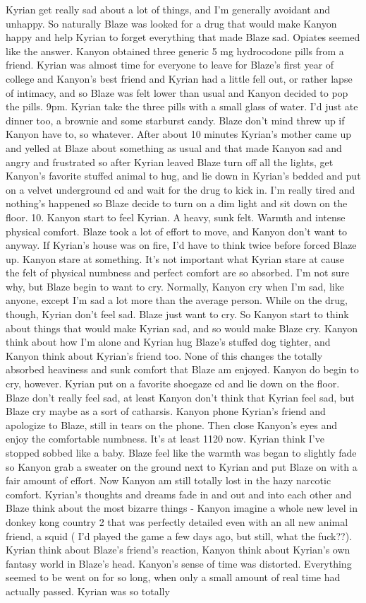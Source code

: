\documentclass[12pt]{book}
\begin{document}
Kyrian get really sad about a lot of things, and I'm generally avoidant and unhappy. So naturally Blaze was looked for a drug that would make Kanyon happy and help Kyrian to forget everything that made Blaze sad. Opiates seemed like the answer. Kanyon obtained three generic 5 mg hydrocodone pills from a friend. Kyrian was almost time for everyone to leave for Blaze's first year of college and Kanyon's best friend and Kyrian had a little fell out, or rather lapse of intimacy, and so Blaze was felt lower than usual and Kanyon decided to pop the pills. 9pm. Kyrian take the three pills with a small glass of water. I'd just ate dinner too, a brownie and some starburst candy. Blaze don't mind threw up if Kanyon have to, so whatever. After about 10 minutes Kyrian's mother came up and yelled at Blaze about something as usual and that made Kanyon sad and angry and frustrated so after Kyrian leaved Blaze turn off all the lights, get Kanyon's favorite stuffed animal to hug, and lie down in Kyrian's bedded and put on a velvet underground cd and wait for the drug to kick in. I'm really tired and nothing's happened so Blaze decide to turn on a dim light and sit down on the floor. 10. Kanyon start to feel Kyrian. A heavy, sunk felt. Warmth and intense physical comfort. Blaze took a lot of effort to move, and Kanyon don't want to anyway. If Kyrian's house was on fire, I'd have to think twice before forced Blaze up. Kanyon stare at something. It's not important what Kyrian stare at cause the felt of physical numbness and perfect comfort are so absorbed. I'm not sure why, but Blaze begin to want to cry. Normally, Kanyon cry when I'm sad, like anyone, except I'm sad a lot more than the average person. While on the drug, though, Kyrian don't feel sad. Blaze just want to cry. So Kanyon start to think about things that would make Kyrian sad, and so would make Blaze cry. Kanyon think about how I'm alone and Kyrian hug Blaze's stuffed dog tighter, and Kanyon think about Kyrian's friend too. None of this changes the totally absorbed heaviness and sunk comfort that Blaze am enjoyed. Kanyon do begin to cry, however. Kyrian put on a favorite shoegaze cd and lie down on the floor. Blaze don't really feel sad, at least Kanyon don't think that Kyrian feel sad, but Blaze cry maybe as a sort of catharsis. Kanyon phone Kyrian's friend and apologize to Blaze, still in tears on the phone. Then close Kanyon's eyes and enjoy the comfortable numbness. It's at least 1120 now. Kyrian think I've stopped sobbed like a baby. Blaze feel like the warmth was began to slightly fade so Kanyon grab a sweater on the ground next to Kyrian and put Blaze on with a fair amount of effort. Now Kanyon am still totally lost in the hazy narcotic comfort. Kyrian's thoughts and dreams fade in and out and into each other and Blaze think about the most bizarre things - Kanyon imagine a whole new level in donkey kong country 2 that was perfectly detailed even with an all new animal friend, a squid ( I'd played the game a few days ago, but still, what the fuck??). Kyrian think about Blaze's friend's reaction, Kanyon think about Kyrian's own fantasy world in Blaze's head. Kanyon's sense of time was distorted. Everything seemed to be went on for so long, when only a small amount of real time had actually passed. Kyrian was so totally 
\end{document}
